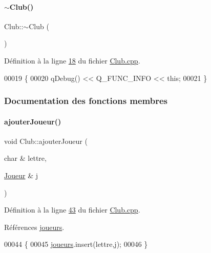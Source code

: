 \paragraph{\texorpdfstring{$\sim$\+Club()}{~Club()}}
{\footnotesize\ttfamily Club\+::$\sim$\+Club (\begin{DoxyParamCaption}{ }\end{DoxyParamCaption})}



Définition à la ligne \hyperlink{_club_8cpp_source_l00018}{18} du fichier \hyperlink{_club_8cpp_source}{Club.\+cpp}.


\begin{DoxyCode}
00019 \{
00020     qDebug() << Q\_FUNC\_INFO << \textcolor{keyword}{this};
00021 \}
\end{DoxyCode}


\subsubsection{Documentation des fonctions membres}
\mbox{\label{class_club_af7cf902fc29f6d587b11a10eec87edff}} 
\paragraph{\texorpdfstring{ajouter\+Joueur()}{ajouterJoueur()}}
{\footnotesize\ttfamily void Club\+::ajouter\+Joueur (\begin{DoxyParamCaption}\item[{char \&}]{lettre,  }\item[{\hyperlink{class_joueur}{Joueur} \&}]{j }\end{DoxyParamCaption})}



Définition à la ligne \hyperlink{_club_8cpp_source_l00043}{43} du fichier \hyperlink{_club_8cpp_source}{Club.\+cpp}.



Références \hyperlink{_club_8h_source_l00022}{joueurs}.


\begin{DoxyCode}
00044 \{
00045     \hyperlink{class_club_a1546f281ba72a07e52cbfd2a60af699b}{joueurs}.insert(lettre,j);
00046 \}
\end{DoxyCode}
\mbox{\label{class_club_aaa3c96659bf305d7a1988ecbd27de30f}} 
